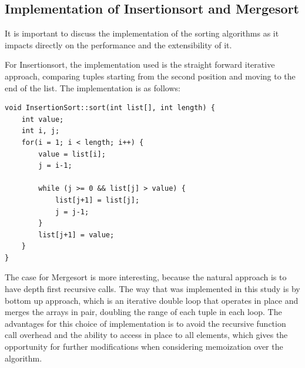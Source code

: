 \documentclass[a4paper,12pt]{article}
\begin{document}
\subsection{Implementation of Insertionsort and Mergesort}
It is important to discuss the implementation of the sorting algorithms as it impacts directly on the performance and the extensibility of it.

For Insertionsort, the implementation used is the straight forward iterative approach, comparing tuples starting from the second position and moving to the end of the list. The implementation is as follows:

\begin{verbatim}
void InsertionSort::sort(int list[], int length) {
	int value;
	int i, j;
	for(i = 1; i < length; i++) {
	    value = list[i];
	    j = i-1;

	    while (j >= 0 && list[j] > value) {
	        list[j+1] = list[j];
	        j = j-1;
	    }
	    list[j+1] = value;
	}
}
\end{verbatim}

The case for Mergesort is more interesting, because the natural approach is to have depth first  recursive calls. The way that was implemented in this study is by bottom up approach, which is an iterative double loop that operates in place and merges the arrays in pair, doubling the range of each tuple in each loop. The advantages for this choice of implementation is to avoid the recursive function call overhead and the ability to access in place to all elements, which gives the opportunity for further modifications when considering memoization over the algorithm.
\end{document}
